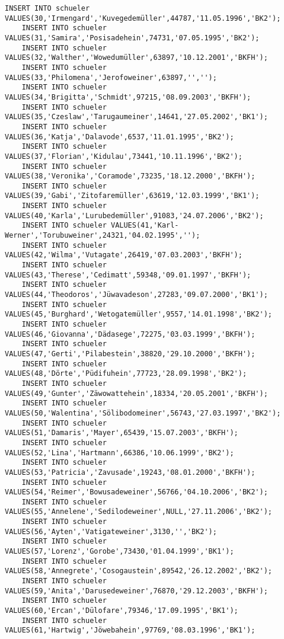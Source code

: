 \begin{lstlisting}[breaklines=True, numbers=none, basicstyle=\tiny, keepspaces=false]
	INSERT INTO schueler VALUES(30,'Irmengard','Kuvegedemüller',44787,'11.05.1996','BK2');
	INSERT INTO schueler VALUES(31,'Samira','Posisadehein',74731,'07.05.1995','BK2');
	INSERT INTO schueler VALUES(32,'Walther','Wowedumüller',63897,'10.12.2001','BKFH');
	INSERT INTO schueler VALUES(33,'Philomena','Jerofoweiner',63897,'','');
	INSERT INTO schueler VALUES(34,'Brigitta','Schmidt',97215,'08.09.2003','BKFH');
	INSERT INTO schueler VALUES(35,'Czeslaw','Tarugaumeiner',14641,'27.05.2002','BK1');
	INSERT INTO schueler VALUES(36,'Katja','Dalavode',6537,'11.01.1995','BK2');
	INSERT INTO schueler VALUES(37,'Florian','Kidulau',73441,'10.11.1996','BK2');
	INSERT INTO schueler VALUES(38,'Veronika','Coramode',73235,'18.12.2000','BKFH');
	INSERT INTO schueler VALUES(39,'Gabi','Zitofaremüller',63619,'12.03.1999','BK1');
	INSERT INTO schueler VALUES(40,'Karla','Lurubedemüller',91083,'24.07.2006','BK2');
	INSERT INTO schueler VALUES(41,'Karl-Werner','Torubuweiner',24321,'04.02.1995','');
	INSERT INTO schueler VALUES(42,'Wilma','Vutagate',26419,'07.03.2003','BKFH');
	INSERT INTO schueler VALUES(43,'Therese','Cedimatt',59348,'09.01.1997','BKFH');
	INSERT INTO schueler VALUES(44,'Theodoros','Jüwavadeson',27283,'09.07.2000','BK1');
	INSERT INTO schueler VALUES(45,'Burghard','Wetogatemüller',9557,'14.01.1998','BK2');
	INSERT INTO schueler VALUES(46,'Giovanna','Dädasege',72275,'03.03.1999','BKFH');
	INSERT INTO schueler VALUES(47,'Gerti','Pilabestein',38820,'29.10.2000','BKFH');
	INSERT INTO schueler VALUES(48,'Dörte','Püdifuhein',77723,'28.09.1998','BK2');
	INSERT INTO schueler VALUES(49,'Gunter','Zäwowattehein',18334,'20.05.2001','BKFH');
	INSERT INTO schueler VALUES(50,'Walentina','Sölibodomeiner',56743,'27.03.1997','BK2');
	INSERT INTO schueler VALUES(51,'Damaris','Mayer',65439,'15.07.2003','BKFH');
	INSERT INTO schueler VALUES(52,'Lina','Hartmann',66386,'10.06.1999','BK2');
	INSERT INTO schueler VALUES(53,'Patricia','Zavusade',19243,'08.01.2000','BKFH');
	INSERT INTO schueler VALUES(54,'Reimer','Bowusadeweiner',56766,'04.10.2006','BK2');
	INSERT INTO schueler VALUES(55,'Annelene','Sedilodeweiner',NULL,'27.11.2006','BK2');
	INSERT INTO schueler VALUES(56,'Ayten','Vatigateweiner',3130,'','BK2');
	INSERT INTO schueler VALUES(57,'Lorenz','Gorobe',73430,'01.04.1999','BK1');
	INSERT INTO schueler VALUES(58,'Annegrete','Cosogaustein',89542,'26.12.2002','BK2');
	INSERT INTO schueler VALUES(59,'Anita','Darusedeweiner',76870,'29.12.2003','BKFH');
	INSERT INTO schueler VALUES(60,'Ercan','Dülofare',79346,'17.09.1995','BK1');
	INSERT INTO schueler VALUES(61,'Hartwig','Jöwebahein',97769,'08.03.1996','BK1');

\end{lstlisting}
